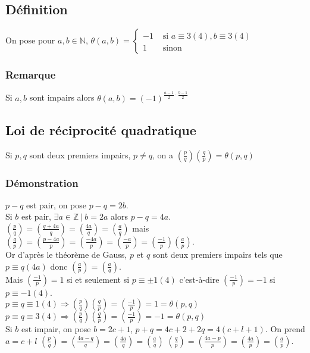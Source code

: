 \documentclass[a4paper,10pt]{book} %
\newcommand{\N}{\mathbb{N}}
\newcommand{\Z}{\mathbb{Z}}
\newcommand{\tq}{~|~}
\newcommand{\legendre}[2]{\left(\frac{#1}{#2}\right)}
\begin{document}
\subsection{Définition}
On pose pour $a,b\in \N$, $\theta(a,b)=\left\{\begin{array}{rl}
-1&\text{ si }a\equiv 3(4), b\equiv 3(4)\\
1&\text{ sinon}
\end{array}\right.$

\subsubsection{Remarque}
Si $a,b$ sont impairs alors $\theta(a,b)=(-1)^{\frac{a-1}{2}\cdot \frac{b-1}{2}}$

\subsection{Loi de réciprocité quadratique}
Si $p,q$ sont deux premiers impairs, $p\neq q$, on a $\legendre{p}{q}\legendre{q}{p}=\theta(p,q)$

\subsubsection{Démonstration}
$p-q$ est pair, on pose $p-q=2b$.\\

Si $b$ est pair, $\exists a\in \Z \tq b=2a$ alors $p-q=4a$.\\
$\legendre{p}{q}=\legendre{q+4a}{q}=\legendre{4a}{q}=\legendre{a}{q}$ mais 
$\legendre{q}{p}=\legendre{p-4a}{p}=\legendre{-4a}{p}=\legendre{-a}{p}=\legendre{-1}{p}\legendre{a}{p}$.\\

Or d'après le théorème de Gauss, $p$ et $q$ sont deux premiers impairs tels que $p\equiv q(4a)$ donc $\legendre{a}{p}=\legendre{a}{q}$.\\
Mais $\legendre{-1}{p}=1$ si et seulement si $p\equiv \pm 1(4)$ c'est-à-dire $\legendre{-1}{p}=-1$ si $p\equiv -1(4)$.\\

$p\equiv q\equiv 1(4) \Rightarrow \legendre{p}{q}\legendre{q}{p}=\legendre{-1}{p}=1=\theta(p,q)$\\
$p\equiv q\equiv 3(4) \Rightarrow \legendre{p}{q}\legendre{q}{p}=\legendre{-1}{p}=-1=\theta(p,q)$\\

Si $b$ est impair, on pose $b=2c+1$, $p+q=4c+2+2q=4(c+l+1)$. On prend $a=c+l$
$\legendre{p}{q}=\legendre{4a-q}{q}=\legendre{4a}{q}=\legendre{a}{q}$
$\legendre{q}{p}=\legendre{4a-p}{p}=\legendre{4a}{p}=\legendre{a}{p}$.\\
\end{document}

